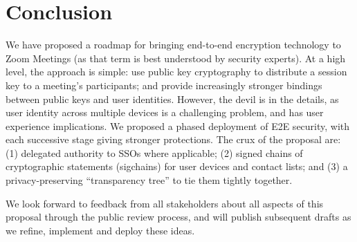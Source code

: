 \section{Conclusion}

We have proposed a roadmap for bringing end-to-end encryption technology to Zoom Meetings (as that term is best understood by security experts). At a high level, the approach is simple: use public key cryptography to distribute a session key to a meeting's participants; and provide increasingly stronger bindings between public keys and user identities. However, the devil is in the details, as user identity across multiple devices is a challenging problem, and has user experience implications. We proposed a phased deployment of E2E security, with each successive stage giving stronger protections. The crux of the proposal are: (1) delegated authority to SSOs where applicable; (2) signed chains of cryptographic statements (sigchains) for user devices and contact lists; and (3) a privacy-preserving ``transparency tree'' to tie them tightly together.

We look forward to feedback from all stakeholders about all aspects of this proposal through the public review process, and will publish subsequent drafts as we refine, implement and deploy these ideas.